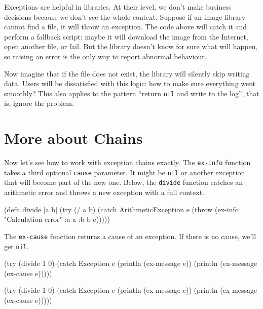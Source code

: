 \fi

Exceptions are helpful in libraries. At their level, we don't make business decisions because we don't see the whole context. Suppose if an image library cannot find a file, it will throw an exception. The code above will catch it and perform a fallback script: maybe it will download the image from the Internet, open another file, or fail. But the library doesn't know for sure what will happen, so raising an error is the only way to report abnormal behaviour.

Now imagine that if the file does not exist, the library will silently skip writing data. Users will be dissatisfied with this logic: how to make sure everything went smoothly? This also applies to the pattern ``return \verb|nil| and write to the log'', that is, ignore the problem.

\section{More about Chains}


Now let's see how to work with exception chains exactly. The \verb|ex-info| function takes a third optional \verb|cause| parameter. It might be \verb|nil| or another exception that will become part of the new one. Below, the \verb|divide| function catches an arithmetic error and throws a new exception with a full context.


\label{re-throw-example}

\begin{clojure}
(defn divide [a b]
  (try
    (/ a b)
    (catch ArithmeticException e
      (throw (ex-info
               "Calculation error"
               {:a a :b b}
               e)))))
\end{clojure}

The \verb|ex-cause| function returns a cause of an exception. If there is no cause, we'll get \verb|nil|.

\ifnarrow

\begin{clojure}
(try
  (divide 1 0)
  (catch Exception e
    (println (ex-message e))
    (println (ex-message
               (ex-cause e)))))
\end{clojure}

\else

\begin{clojure}
(try
  (divide 1 0)
  (catch Exception e
    (println (ex-message e))
    (println (ex-message (ex-cause e)))))
\end{clojure}


